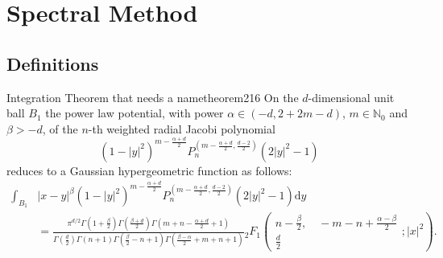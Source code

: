 \chapter{Spectral Method}
\label{chap:spectral-method}

% 

\section{Definitions}













\begin{theorem}{Integration Theorem that needs a name}{theorem216}
  On the $d$-dimensional unit ball $B_1$ the power law potential, with power $\alpha \in(-d,2+2m-d)$, $m\in\mathbb{N}_0$ and $\beta>-d$, of the $n$-th weighted radial Jacobi polynomial $$(1-|y|^2)^{m-\frac{\alpha+d}{2}}P_n^{(m-\frac{\alpha+d}{2},\frac{d-2}{2})}(2|y|^2-1)$$ reduces to a Gaussian hypergeometric function as follows:
  \begin{align*}
    \int_{B_1} & |x-y|^\beta (1-|y|^2)^{m-\frac{\alpha+d}{2}} P_n^{(m-\frac{\alpha+d}{2},\frac{d-2}{2})}(2|y|^2-1) \mathrm{d}y                                                                                                                                                                                                                                                                                               \\
               & = \tfrac{\pi ^{d/2} \Gamma \left(1+\frac{\beta}{2}\right) \Gamma \left(\frac{\beta+d}{2}\right) \Gamma \left(m+n-\frac{\alpha+d}{2}+1\right)}{\Gamma \left(\frac{d}{2}\right) \Gamma (n+1) \Gamma \left(\frac{\beta}{2}-n+1\right) \Gamma \left(\frac{\beta-\alpha}{2}+m+n+1\right)}{}_2F_1\left(\begin{matrix}n-\frac{\beta}{2}, \quad -m-n+\frac{\alpha-\beta}{2} \\\frac{d}{2}\end{matrix};|x|^2\right).
  \end{align*}
\end{theorem}

